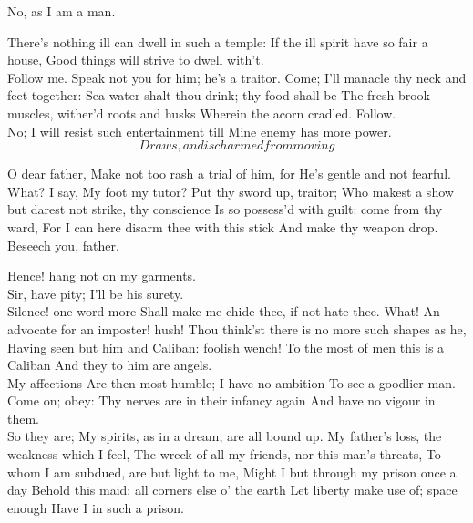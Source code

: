 \documentclass[11pt]{book}
\begin{document}
\3	No, as I am a man.

\2	There's nothing ill can dwell in such a temple:
	If the ill spirit have so fair a house,
	Good things will strive to dwell with't. \\

\1	Follow me.
	Speak not you for him; he's a traitor. Come;
	I'll manacle thy neck and feet together:
	Sea-water shalt thou drink; thy food shall be
	The fresh-brook muscles, wither'd roots and husks
	Wherein the acorn cradled. Follow. \\

\3	No;
	I will resist such entertainment till
	Mine enemy has more power. \\

	\[Draws, and is charmed from moving\]

\2	O dear father,
	Make not too rash a trial of him, for
	He's gentle and not fearful. \\

\1	What? I say,
	My foot my tutor? Put thy sword up, traitor;
	Who makest a show but darest not strike, thy conscience
	Is so possess'd with guilt: come from thy ward,
	For I can here disarm thee with this stick
	And make thy weapon drop. \\

\2	Beseech you, father.

\1	Hence! hang not on my garments. \\

\2	Sir, have pity;
	I'll be his surety. \\

\1	Silence! one word more
	Shall make me chide thee, if not hate thee. What!
	An advocate for an imposter! hush!
	Thou think'st there is no more such shapes as he,
	Having seen but him and Caliban: foolish wench!
	To the most of men this is a Caliban
	And they to him are angels. \\

\2	My affections
	Are then most humble; I have no ambition
	To see a goodlier man. \\

\1	Come on; obey:
	Thy nerves are in their infancy again
	And have no vigour in them. \\

\3	So they are;
	My spirits, as in a dream, are all bound up.
	My father's loss, the weakness which I feel,
	The wreck of all my friends, nor this man's threats,
	To whom I am subdued, are but light to me,
	Might I but through my prison once a day
	Behold this maid: all corners else o' the earth
	Let liberty make use of; space enough
	Have I in such a prison. \\
\end{document}
